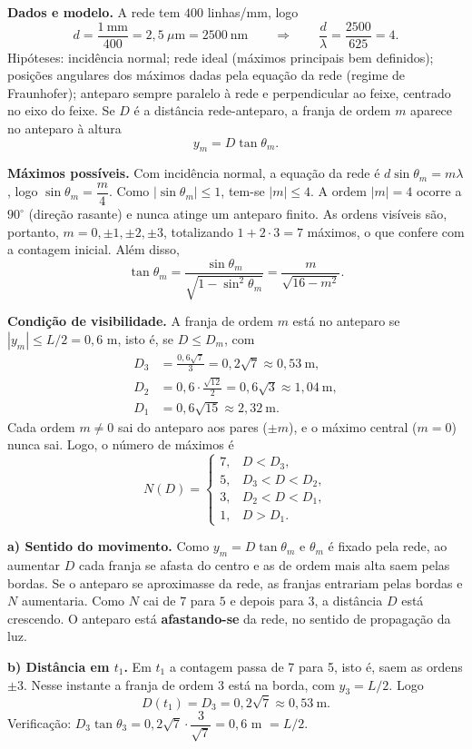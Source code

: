 \documentclass{article}%
\begin{document}
\textbf{Dados e modelo.} A rede tem $400$ linhas/mm, logo
\[
d=\frac{1\ \text{mm}}{400}=2{,}5\ \mu\text{m}=2500\ \text{nm}\qquad\Rightarrow\qquad \frac{d}{\lambda}=\frac{2500}{625}=4 .
\]
Hipóteses: incidência normal; rede ideal (máximos principais bem definidos); posições angulares dos máximos dadas pela equação da rede (regime de Fraunhofer); anteparo sempre paralelo à rede e perpendicular ao feixe, centrado no eixo do feixe. Se $D$ é a distância rede-anteparo, a franja de ordem $m$ aparece no anteparo à altura
\[
y_m=D\tan\theta_m .
\]

\textbf{Máximos possíveis.} Com incidência normal, a equação da rede é $d\sin\theta_m=m\lambda$, logo $\sin\theta_m=\dfrac{m}{4}$. Como $|\sin\theta_m|\le 1$, tem-se $|m|\le 4$. A ordem $|m|=4$ ocorre a $90^\circ$ (direção rasante) e nunca atinge um anteparo finito. As ordens visíveis são, portanto, $m=0,\pm1,\pm2,\pm3$, totalizando $1+2\cdot 3=7$ máximos, o que confere com a contagem inicial. Além disso,
\[
\tan\theta_m=\frac{\sin\theta_m}{\sqrt{1-\sin^2\theta_m}}=\frac{m}{\sqrt{16-m^2}} .
\]

\textbf{Condição de visibilidade.} A franja de ordem $m$ está no anteparo se $|y_m|\le L/2=0{,}6$ m, isto é, se $D\le D_m$, com
\begin{align*}
D_3&=\frac{0{,}6\sqrt{7}}{3}=0{,}2\sqrt{7}\approx 0{,}53\ \text{m},\\
D_2&=0{,}6\cdot\frac{\sqrt{12}}{2}=0{,}6\sqrt{3}\approx 1{,}04\ \text{m},\\
D_1&=0{,}6\sqrt{15}\approx 2{,}32\ \text{m}.
\end{align*}
Cada ordem $m\neq 0$ sai do anteparo aos pares ($\pm m$), e o máximo central ($m=0$) nunca sai. Logo, o número de máximos é
\[
N(D)=\begin{cases}7, & D<D_3,\\ 5, & D_3<D<D_2,\\ 3, & D_2<D<D_1,\\ 1, & D>D_1.\end{cases}
\]

\textbf{a) Sentido do movimento.} Como $y_m=D\tan\theta_m$ e $\theta_m$ é fixado pela rede, ao aumentar $D$ cada franja se afasta do centro e as de ordem mais alta saem pelas bordas. Se o anteparo se aproximasse da rede, as franjas entrariam pelas bordas e $N$ aumentaria. Como $N$ cai de $7$ para $5$ e depois para $3$, a distância $D$ está crescendo. O anteparo está \textbf{afastando-se} da rede, no sentido de propagação da luz.

\textbf{b) Distância em $t_1$.} Em $t_1$ a contagem passa de 7 para 5, isto é, saem as ordens $\pm 3$. Nesse instante a franja de ordem 3 está na borda, com $y_3=L/2$. Logo
\[
D(t_1)=D_3=0{,}2\sqrt{7}\approx 0{,}53\ \text{m}.
\]
Verificação: $D_3\tan\theta_3=0{,}2\sqrt{7}\cdot\dfrac{3}{\sqrt{7}}=0{,}6$ m $=L/2$.
\end{document}
